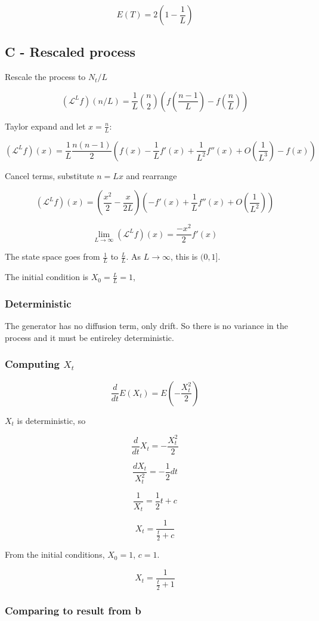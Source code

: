 \documentclass{article}
\begin{document}
$$E(T) = 2(1 - \frac{1}{L})$$


\subsection{C - Rescaled process}

Rescale the process to $N_t/L$

$$(\mathcal{L}^Lf)(n/L) = \frac{1}{L} {n\choose2} (f(\frac{n-1}{L}) - f(\frac{n}{L}))$$

Taylor expand and let $x=\frac{n}{L}$:

$$(\mathcal{L}^Lf)(x) = \frac{1}{L}\frac{n(n-1)}{2} (f(x) - \frac{1}{L}f'(x) + \frac{1}{L^2}f''(x) + O(\frac{1}{L^3}) - f(x))$$

Cancel terms, substitute $n=Lx$ and rearrange

$$(\mathcal{L}^Lf)(x) = (\frac{x^2}{2} - \frac{x}{2L})(- f'(x) + \frac{1}{L}f''(x) + O(\frac{1}{L^2}))$$

$$\lim_{L \to \infty} (\mathcal{L}^Lf)(x) = \frac{-x^2}{2}f'(x)$$

The state space goes from $\frac{1}{L}$ to $\frac{L}{L}$. As $L \to \infty$, this is $(0,1]$. 

The initial condition is $X_0 = \frac{L}{L} = 1$, 


\subsubsection{Deterministic}

The generator has no diffusion term, only drift. So there is no variance in the process and it must be entireley deterministic. 

\subsubsection{Computing $X_t$}

$$\frac{d}{dt}E(X_t) = E(-\frac{X_t^2}{2})$$

$X_t$ is deterministic, so

$$\frac{d}{dt}X_t = -\frac{X_t^2}{2}$$

$$\frac{dX_t}{X_t^2} = -\frac{1}{2}dt$$


$$\frac{1}{X_t} = \frac{1}{2}t + c$$


$$X_t = \frac{1}{\frac{t}{2}+c}$$

From the initial conditions, $X_0=1$, $c=1$.

$$X_t = \frac{1}{\frac{t}{2}+1}$$

\subsubsection{Comparing to result from b}
\end{document}

